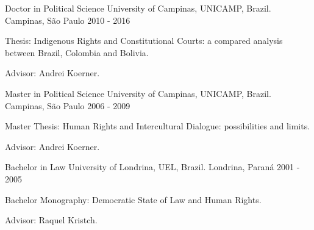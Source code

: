 \begin{cventries}
\cventry
{Doctor in Political Science} %
{University of Campinas, UNICAMP, Brazil.} %
{Campinas, São Paulo} %
{2010 - 2016} %
{
  \begin{cvitems} %
    \item Thesis: Indigenous Rights and Constitutional Courts: a compared analysis between Brazil, Colombia and Bolivia.
    \item Advisor: Andrei Koerner.
  \end{cvitems}
}

\cventry
{Master in Political Science}
{University of Campinas, UNICAMP, Brazil.}
{Campinas, São Paulo}
{2006 - 2009}
{
\begin{cvitems}
  \item Master Thesis: Human Rights and Intercultural Dialogue: possibilities and limits.
  \item Advisor: Andrei Koerner.
 \end{cvitems}
}

\cventry
{Bachelor in Law}
{University of Londrina, UEL, Brazil.}
{Londrina, Paraná}
{2001 - 2005}
{
\begin{cvitems}
  \item Bachelor Monography: Democratic State of Law and Human Rights.
  \item Advisor: Raquel Kristch.
 \end{cvitems}
}

\end{cventries}
